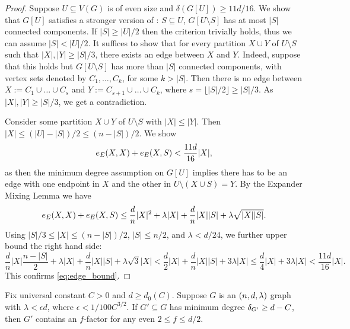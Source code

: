 \documentclass[11pt]{article}
\begin{document}
\begin{proof}
  Suppose $U \subseteq V(G)$ is of even size and $\delta(G[U]) \ge 11d/16$.
  We show that $G[U]$ satisfies a stronger version of :  $S \subseteq U$, $G[U \setminus S]$ has at most $|S|$ connected components.
  If $|S| \ge |U|/2$ then the criterion trivially holds, thus we can assume $|S| < |U|/2$.
  It suffices to show that for every partition $X \cup Y$ of $U \setminus S$ such that $|X|, |Y| \ge |S|/3$, there exists an edge between $X$ and $Y$.
  Indeed, suppose that this holds but $G[U \setminus S]$ has more than $|S|$ connected components, with vertex sets denoted by $C_1, \ldots, C_k$, for some $k > |S|$.
  Then there is no edge between $X := C_1 \cup \ldots \cup C_{s}$ and $Y := C_{s+1} \cup \ldots \cup C_{k}$, where $s = \lfloor |S|/2 \rfloor \ge |S|/3$. As $|X|, |Y| \ge |S|/3$, we get a contradiction.

    Consider some partition $X \cup Y$ of $U \setminus S$ with $|X| \le |Y|$. Then $|X| \le (|U| - |S|)/2 \le (n - |S|)/2$. We show
    \begin{equation} \label{eq:edge_bound}
        \CutEdges{X}{X}{E} + \CutEdges{X}{S}{E} < \frac{11d}{16}|X|,
    \end{equation}
    as then the minimum degree assumption on $G[U]$ implies there has to be an edge with one endpoint in $X$ and the other in $U \setminus (X \cup S) = Y$. By the Expander Mixing Lemma we have
    \[
        \CutEdges{X}{X}{E} + \CutEdges{X}{S}{E} \le \frac{d}{n}|X|^2 + \lambda |X| + \frac{d}{n}|X||S| + \lambda\sqrt{|X||S|}.
    \]
    Using $|S|/3 \le |X| \le (n-|S|)/2$, $|S| \le n/2$, and $\lambda < d/24$,  we further upper bound the right hand side:
    \[
        \frac{d}{n} |X| \frac{n-|S|}{2} + \lambda |X| + \frac{d}{n}|X||S| + \lambda\sqrt{3} |X| < \frac{d}{2}|X| + \frac{d}{n}|X||S| + 3 \lambda |X| \le \frac{d}{4} |X| + 3\lambda |X| < \frac{11d}{16}|X|.
    \]
    This confirms \eqref{eq:edge_bound}.
\end{proof}

\begin{lemma}\label{lemma:f-factor}
  Fix universal constant $C > 0$ and $d \ge d_0(C)$.
Suppose $G$ is an $\EnDeeLambda$ graph with $\lambda < \epsilon d$, where $\epsilon < 1/100C^{3/2}$.
If $G' \subseteq G$ has minimum degree $\MinimalDegree{G'} \ge d - C$, then $G'$ contains an $f$-factor for any even $2 \le f \le d/2$.
\end{lemma}
\end{document}
